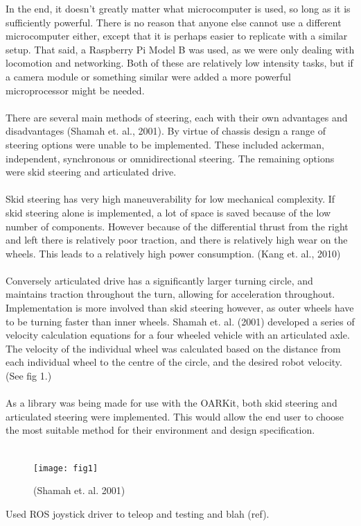 \documentclass[]{article}
\begin{document}
In the end, it doesn't greatly matter what microcomputer is used, so long as it is sufficiently powerful. There is no reason that anyone else cannot use a different microcomputer either, except that it is perhaps easier to replicate with a similar setup. That said, a Raspberry Pi Model B was used, as we were only dealing with locomotion and networking. Both of these are relatively low intensity tasks, but if a camera module or something similar were added a more powerful microprocessor might be needed.
\\
\\
There are several main methods of steering, each with their own advantages and disadvantages (Shamah et. al., 2001). By virtue of chassis design a range of steering options were unable to be implemented. These included ackerman, independent, synchronous or omnidirectional steering. The remaining options were skid steering and articulated drive.
\\
\\
Skid steering has very high maneuverability for low mechanical complexity. If skid steering alone is implemented, a lot of space is saved because of the low number of components. However because of the differential thrust from the right and left there is relatively poor traction, and there is relatively high wear on the wheels. This leads to a relatively high power consumption. (Kang et. al., 2010)
\\
\\
Conversely articulated drive has a significantly larger turning circle, and  maintains traction throughout the turn, allowing for acceleration throughout. Implementation is more involved than skid steering however, as outer wheels have to be turning faster than inner wheels. Shamah et. al. (2001) developed a series of velocity calculation equations for a four wheeled vehicle with an articulated axle. The velocity of the individual wheel was calculated based on the distance from each individual wheel to the centre of the circle, and the desired robot velocity. (See fig 1.)
\\
\\
As a library was being made for use with the OARKit, both skid steering and articulated steering were implemented. This would allow the end user to choose the most suitable method for their environment and design specification.
\\
\\
\begin{figure}
\texttt{[image: fig1]}
\caption{(Shamah et. al. 2001)}
\end{figure}
Used ROS joystick driver to teleop and testing and blah (ref).
\end{document}
